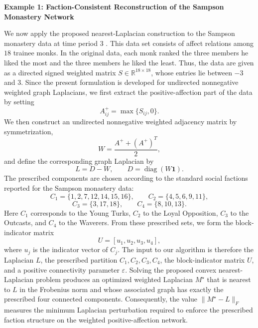 \documentclass[11pt]{article}
\begin{document}
\textbf{Example 1: Faction-Consistent Reconstruction of the Sampson Monastery Network}


We now apply the proposed nearest-Laplacian construction to the Sampson
monastery data at time period 3 \cite{ArefEtAl2020, Sampson1968}. This data set consists of affect relations
among $18$ trainee monks. In the original data, each monk ranked the three
members he liked the most and the three members he liked the least. Thus,
the data are given as a directed signed weighted matrix
$S\in\mathbb{R}^{18\times 18}$, whose entries lie between $-3$ and $3$.
Since the present formulation is developed for undirected nonnegative
weighted graph Laplacians, we first extract the positive-affection part of
the data by setting
$$
A^+_{ij}=\max\{S_{ij},0\}.
$$
We then construct an undirected nonnegative weighted adjacency matrix by
symmetrization,
$$
W=\frac{A^+ +(A^+)^T}{2},
$$
and define the corresponding graph Laplacian by
$$
L=D-W,\qquad D=\operatorname{diag}(W\mathbf{1}).
$$
The prescribed components are chosen according to the standard social
factions reported for the Sampson monastery data:
$$
C_1=\{1,2,7,12,14,15,16\},\qquad
C_2=\{4,5,6,9,11\},
$$
$$
C_3=\{3,17,18\},\qquad
C_4=\{8,10,13\}.
$$
Here $C_1$ corresponds to the Young Turks, $C_2$ to the Loyal Opposition,
$C_3$ to the Outcasts, and $C_4$ to the Waverers. From these prescribed
sets, we form the block-indicator matrix
$$
U=[u_1,u_2,u_3,u_4],
$$
where $u_j$ is the indicator vector of $C_j$. The input to our algorithm is
therefore the Laplacian $L$, the prescribed partition
$C_1,C_2,C_3,C_4$, the block-indicator matrix $U$, and a positive
connectivity parameter $\varepsilon$. Solving the proposed convex
nearest-Laplacian problem produces an optimized weighted Laplacian
$M^\star$ that is nearest to $L$ in the Frobenius norm and whose associated
graph has exactly the prescribed four connected components. Consequently,
the value $\|M^\star-L\|_F$ measures the minimum Laplacian perturbation
required to enforce the prescribed faction structure on the weighted
positive-affection network.\\

	\label{fig:example1}
\end{document}
